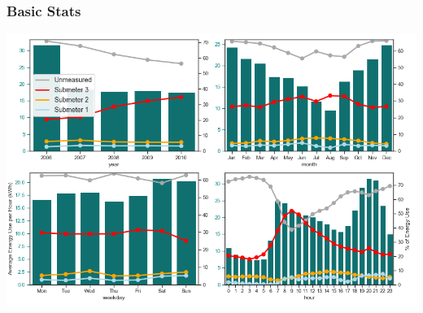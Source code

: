 \documentclass[10pt]{beamer}
\begin{document}
\begin{frame}
\frametitle{Basic Stats}

{
    \centering
    \includegraphics[width=\textwidth,height=\textheight,keepaspectratio]{periodicity.png}
    \par
}

\end{frame}

\end{document}
